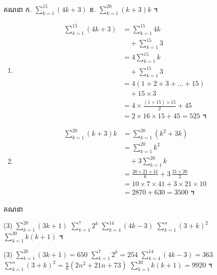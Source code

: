\begin{example}[លំហាត់គំរូ]
គណនា \quad ក. $\displaystyle\sum_{k=1}^{15} (4k + 3)$ \quad ខ. $\displaystyle\sum_{k=1}^{20} (k + 3)k$ ។
\end{example}
\ans
\begin{enumerate}[a]
  \item \[
  \begin{aligned}
\sum_{k=1}^{15} (4k + 3) &= \sum_{k=1}^{15} 4k\\
&\quad + \sum_{k=1}^{15} 3\\
&= 4\sum_{k=1}^{15} k\\
&\quad + \sum_{k=1}^{15} 3\\
&= 4(1 + 2 + 3 + \ldots + 15)\\
&\quad + 15 \times 3\\
&= 4 \times \frac{(1 + 15) \times 15}{2} + 45\\
&= 2 \times 16 \times 15 + 45 = 525 \text{ ។}
\end{aligned}
  \]
  \item \[
  \begin{aligned}
\sum_{k=1}^{20} (k + 3)k &= \sum_{k=1}^{20} (k^2 + 3k)\\
&= \sum_{k=1}^{20} k^2\\
&\quad + 3\sum_{k=1}^{20} k\\
&= \frac{20 \times 21 \times 41}{6} + 3\,\frac{21 \times 20}{2}\\
&= 10 \times 7 \times 41 + 3 \times 21 \times 10\\
&= 2870 + 630 = 3500 \text{ ។}
\end{aligned}
  \]
\end{enumerate}

\begin{pro}
គណនា
\begin{tasks}(3)
  \task $\displaystyle\sum_{k=1}^{20} (3k + 1)$
  \task $\displaystyle\sum_{k=1}^{7} 2^k$
  \task $\displaystyle\sum_{k=4}^{14} (4k - 3)$
  \task $\displaystyle\sum_{k=1}^{n} (3 + k)^2$
  \task $\displaystyle\sum_{k=1}^{30} k(k+1)$ ។
\end{tasks}
\ans
\begin{tasks}(3)
  \task $\displaystyle\sum_{k=1}^{20} (3k + 1) = 650$
  \task $\displaystyle\sum_{k=1}^{7} 2^k = 254$
  \task $\displaystyle\sum_{k=4}^{14} (4k - 3) = 363$
  \task $\displaystyle\sum_{k=1}^{n} (3 + k)^2 = \frac{n}{6}(2n^2 + 21n + 73)$
  \task $\displaystyle\sum_{k=1}^{30} k(k+1) = 9920$ ។
\end{tasks}
\end{pro}

